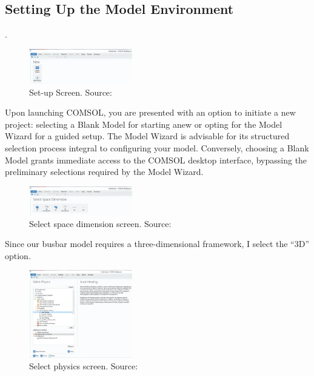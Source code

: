 \subsection{Setting Up the Model Environment}.
\begin{figure}[ht!]
  \centering
  \includegraphics[width=0.4\textwidth]{Chapters/Figures/Chapter 3 Figures/Set-up Screen.png}
  \caption{Set-up Screen. Source: \cite{multiphysics__modeling_nodate}}
  \label{fig:Set-up Screen}
\end{figure}

Upon launching COMSOL, you are presented with an option to initiate a new project: selecting a Blank Model for starting anew or opting for the Model Wizard for a guided setup. The Model Wizard is advisable for its structured selection process integral to configuring your model. Conversely, choosing a Blank Model grants immediate access to the COMSOL desktop interface, bypassing the preliminary selections required by the Model Wizard.

\begin{figure}[ht!]
  \centering
  \includegraphics[width=0.4\textwidth]{Chapters/Figures/Chapter 3 Figures/Select Space Dimension.png}
  \caption{Select space dimension screen. Source: \cite{multiphysics__modeling_nodate}}
  \label{fig:Select Space Dimension}
\end{figure}

Since our busbar model requires a three-dimensional framework, I select the ``3D'' option.

\begin{figure}[ht!]
  \centering
  \includegraphics[width=0.4\textwidth]{Chapters/Figures/Chapter 3 Figures/Select Physics.png}
  \caption{Select physics screen. Source: \cite{multiphysics__modeling_nodate}}
  \label{fig:Select Physics}
\end{figure}

